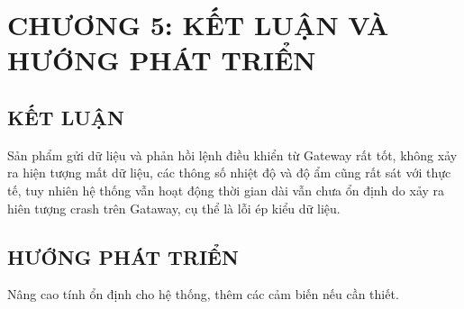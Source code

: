 \section*{CHƯƠNG 5: KẾT LUẬN VÀ HƯỚNG PHÁT TRIỂN}
\setcounter{section}{5}
\setcounter{subsection}{0}
\subsection{KẾT LUẬN}
Sản phẩm gửi dữ liệu và phản hồi lệnh điều khiển từ Gateway rất tốt, không xảy ra hiện tượng mất dữ liệu, các thông số nhiệt độ và độ ẩm cũng rất sát với thực tế, tuy nhiên hệ thống vẫn hoạt động thời gian dài vẫn chưa ổn định do xảy ra hiên tượng crash trên Gataway, cụ thể là lỗi ép kiểu dữ liệu.
\subsection{HƯỚNG PHÁT TRIỂN}
Nâng cao tính ổn định cho hệ thống, thêm các cảm biến nếu cần thiết.